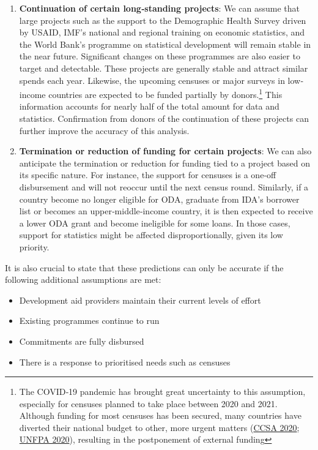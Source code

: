 \documentclass[
]{article}
\providecommand{\tightlist}{%
  \setlength{\itemsep}{0pt}\setlength{\parskip}{0pt}}
\begin{document}
\begin{enumerate}
\def\labelenumi{\arabic{enumi}.}
\item
  \textbf{Continuation of certain long‐standing projects}: We can assume that large projects such as
  the support to the Demographic Health Survey driven by USAID, IMF's national and regional
  training on economic statistics, and the World Bank's programme on statistical development
  will remain stable in the near future. Significant changes on these programmes are also easier
  to target and detectable. These projects are generally stable and attract similar spends each
  year. Likewise, the upcoming censuses or major surveys in low‐income countries are expected
  to be funded partially by donors.\footnote{The COVID‐19 pandemic has brought great uncertainty to this assumption, especially for censuses planned
    to take place between 2020 and 2021. Although funding for most censuses has been secured, many countries
    have diverted their national budget to other, more urgent matters (\protect\hyperlink{ref-CCSA}{CCSA 2020}; \protect\hyperlink{ref-UNFPA}{UNFPA 2020}), resulting in
    the postponement of external funding} This information accounts for nearly half of the total
  amount for data and statistics. Confirmation from donors of the continuation of these projects
  can further improve the accuracy of this analysis.
\item
  \textbf{Termination or reduction of funding for certain projects}: We can also anticipate the
  termination or reduction for funding tied to a project based on its specific nature. For instance,
  the support for censuses is a one‐off disbursement and will not reoccur until the next census
  round. Similarly, if a country become no longer eligible for ODA, graduate from IDA's borrower
  list or becomes an upper‐middle‐income country, it is then expected to receive a lower ODA
  grant and become ineligible for some loans. In those cases, support for statistics might be
  affected disproportionally, given its low priority.
\end{enumerate}

It is also crucial to state that these predictions can only be accurate if the following additional
assumptions are met:

\begin{itemize}
\tightlist
\item
  Development aid providers maintain their current levels of effort
\item
  Existing programmes continue to run
\item
  Commitments are fully disbursed
\item
  There is a response to prioritised needs such as censuses
\end{itemize}
\end{document}
